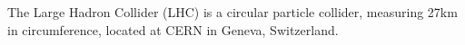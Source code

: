 
The Large Hadron Collider (LHC) is a circular particle collider, measuring 27km
in circumference, located at \ac{CERN} in Geneva, Switzerland.
